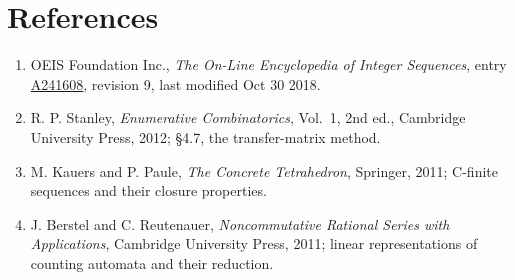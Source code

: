 \documentclass[11pt]{article}
\theoremstyle{definition}
\begin{document}
\section{References}

\begin{enumerate}

\item OEIS Foundation Inc., \emph{The On-Line Encyclopedia of Integer Sequences}, entry \href{https://oeis.org/A241608}{A241608}, revision 9, last modified Oct 30 2018.

\item R. P. Stanley, \emph{Enumerative Combinatorics}, Vol.~1, 2nd ed., Cambridge University Press, 2012; \S4.7, the transfer-matrix method.

\item M. Kauers and P. Paule, \emph{The Concrete Tetrahedron}, Springer, 2011; C-finite sequences and their closure properties.

\item J. Berstel and C. Reutenauer, \emph{Noncommutative Rational Series with Applications}, Cambridge University Press, 2011; linear representations of counting automata and their reduction.

\end{enumerate}
\end{document}
